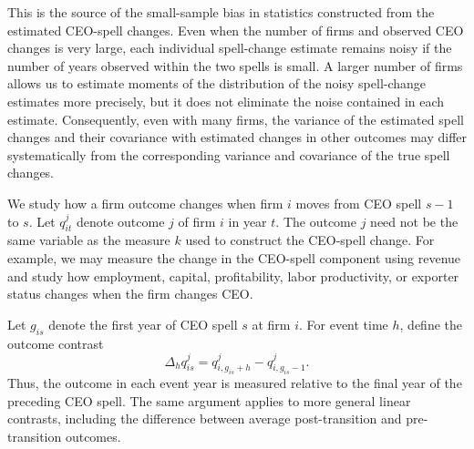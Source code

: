 \documentclass[11pt,a4paper]{article}
\begin{document}
This is the source of the small-sample bias in statistics constructed from the estimated CEO-spell changes. Even when the number of firms and observed CEO changes is very large, each individual spell-change estimate remains noisy if the number of years observed within the two spells is small. A larger number of firms allows us to estimate moments of the distribution of the noisy spell-change estimates more precisely, but it does not eliminate the noise contained in each estimate. Consequently, even with many firms, the variance of the estimated spell changes and their covariance with estimated changes in other outcomes may differ systematically from the corresponding variance and covariance of the true spell changes.

We study how a firm outcome changes when firm $i$ moves from CEO spell
$s-1$ to $s$. Let $q_{it}^{j}$ denote outcome $j$ of firm $i$ in
year $t$. The outcome $j$ need not be the same variable as the measure
$k$ used to construct the CEO-spell change. For example, we may measure
the change in the CEO-spell component using revenue and study how
employment, capital, profitability, labor productivity, or exporter
status changes when the firm changes CEO.

Let $g_{is}$ denote the first year of CEO spell $s$ at firm $i$. For
event time $h$, define the outcome contrast
\begin{equation}
\Delta_h q_{is}^{j}
=
q_{i,g_{is}+h}^{j}
-
q_{i,g_{is}-1}^{j}.
\label{eq:outcome_contrast}
\end{equation}
Thus, the outcome in each event year is measured relative to the final
year of the preceding CEO spell. The same argument applies to more
general linear contrasts, including the difference between average
post-transition and pre-transition outcomes.
\end{document}
